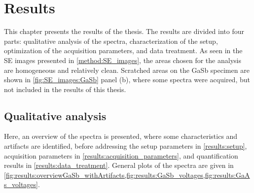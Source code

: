 \chapter{Results}
\label{ch:results}




This chapter presents the results of the thesis.
The results are divided into four parts: qualitative analysis of the spectra, characterization of the setup, optimization of the acquisition parameters, and data treatment.
As seen in the SE images presented in \cref{method:SE_images}, the areas chosen for the analysis are homogeneous and relatively clean.
Scratched areas on the GaSb specimen are shown in \cref{fig:SE_images:GaSb} panel (b), where some spectra were acquired, but not included in the results of this thesis.



\section{Qualitative analysis}
\label{results:qualitative_analysis}

Here, an overview of the spectra is presented, where some characteristics and artifacts are identified, before addressing the setup parameters in \cref{results:setup}, acquisition parameters in \cref{results:acquisition_parameters}, and quantification results in \cref{results:data_treatment}.
General plots of the spectra are given in \cref{fig:results:overviewGaSb_withArtifacts,fig:results:GaSb_voltages,fig:results:GaAs_voltages}.



